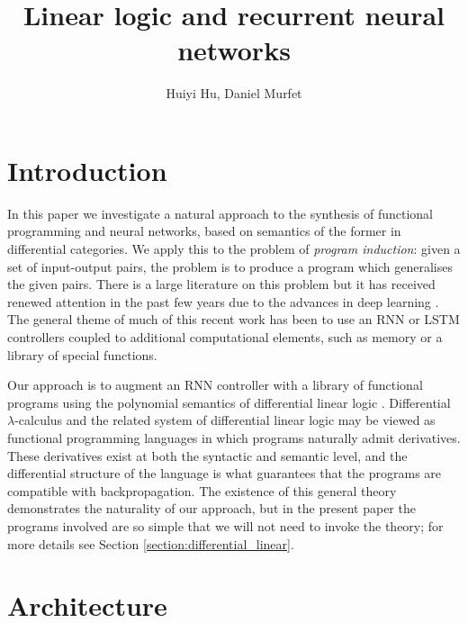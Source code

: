 \documentclass[english,letter paper,12pt,leqno]{article}
\theoremstyle{example}
\numberwithin{equation}{section}
\def\res{\operatorname{Res}}
\begin{document}
\def\Res{\res\!}
\newcommand{\ud}{\mathrm{d}}
\newcommand{\Ress}[1]{\res_{#1}\!}
\newcommand{\cat}[1]{\mathcal{#1}}
\newcommand{\lto}{\longrightarrow}
\newcommand{\xlto}[1]{\stackrel{#1}\lto}
\newcommand{\mf}[1]{\mathfrak{#1}}
\newcommand{\md}[1]{\mathscr{#1}}
\def\sus{\l}
\def\l{\,|\,}
\def\sgn{\textup{sgn}}
\newcommand{\den}[1]{\llbracket #1 \rrbracket}

\title{Linear logic and recurrent neural networks}
\author{Huiyi Hu, Daniel Murfet}

\maketitle

\section{Introduction}

In this paper we investigate a natural approach to the synthesis of functional programming and neural networks, based on semantics of the former in differential categories. We apply this to the problem of \emph{program induction}: given a set of input-output pairs, the problem is to produce a program which generalises the given pairs. There is a large literature on this problem \cite{??,??} but it has received renewed attention in the past few years due to the advances in deep learning \cite{??,??,??}. The general theme of much of this recent work has been to use an RNN or LSTM controllers coupled to additional computational elements, such as memory or a library of special functions. 

Our approach is to augment an RNN controller with a library of functional programs using the polynomial semantics of differential linear logic \cite{murfet_logic,murfetclift}. Differential $\lambda$-calculus \cite{difflambda} and the related system of differential linear logic \cite{ehrhard-survey} may be viewed as functional programming languages in which programs naturally admit derivatives. These derivatives exist at both the syntactic and semantic level, and the differential structure of the language is what guarantees that the programs are compatible with backpropagation. The existence of this general theory demonstrates the naturality of our approach, but in the present paper the programs involved are so simple that we will not need to invoke the theory; for more details see Section \ref{section:differential_linear}.

\section{Architecture}
\end{document}
